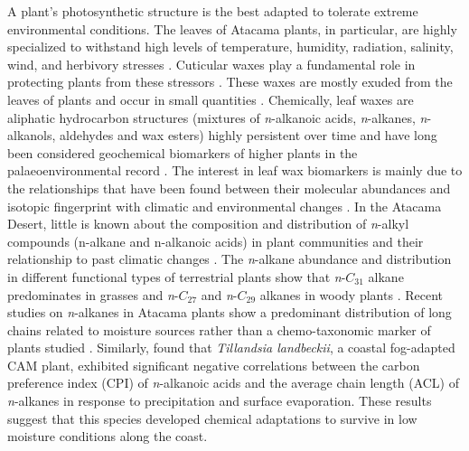 \documentclass[
  authoryear,
  preprint,
  3p]{elsarticle}
\begin{document}
A plant's photosynthetic structure is the best adapted to tolerate
extreme environmental conditions. The leaves of Atacama plants, in
particular, are highly specialized to withstand high levels of
temperature, humidity, radiation, salinity, wind, and herbivory stresses
\citep{eshelPlantEcologicalGenomics2021, dussarratPredictiveMetabolomicsMultiple2022}.
Cuticular waxes play a fundamental role in protecting plants from these
stressors \citep{pollardBuildingLipidBarriers2008}. These waxes are
mostly exuded from the leaves of plants and occur in small quantities
\citep{eglintonChemicalFossilsCombined1973}. Chemically, leaf waxes are
aliphatic hydrocarbon structures (mixtures of \emph{n}-alkanoic acids,
\emph{n}-alkanes, \emph{n}-alkanols, aldehydes and wax esters) highly
persistent over time and have long been considered geochemical
biomarkers of higher plants in the palaeoenvironmental record
\citep{didykOrganicGeochemicalIndicators1978, bushLeafWaxNalkane2013, liEffectsEarlyDiagenesis2017, inglisBiomarkerApproachesReconstructing2022}.
The interest in leaf wax biomarkers is mainly due to the relationships
that have been found between their molecular abundances and isotopic
fingerprint with climatic and environmental changes
\citep{sachseDDValuesIndividual2006, smithInfluencePhysiologyClimate2006}.
In the Atacama Desert, little is known about the composition and
distribution of \emph{n}-alkyl compounds (n-alkane and n-alkanoic acids)
in plant communities and their relationship to past climatic changes
\citep{morchenFingerprintPlantLife2021, contrerasLeafWaxComposition2022}.
The \emph{n}-alkane abundance and distribution in different functional
types of terrestrial plants show that \emph{n}-\(C_{31}\) alkane
predominates in grasses and \emph{n}-\(C_{27}\) and \emph{n}-\(C_{29}\)
alkanes in woody plants \citep{bushLeafWaxNalkane2013}. Recent studies
on \emph{n}-alkanes in Atacama plants show a predominant distribution of
long chains related to moisture sources rather than a chemo-taxonomic
marker of plants studied \citep{morchenFingerprintPlantLife2021}.
Similarly, \citet{contrerasLeafWaxComposition2022} found that
\emph{Tillandsia landbeckii}, a coastal fog-adapted CAM plant, exhibited
significant negative correlations between the carbon preference index
(CPI) of \emph{n}-alkanoic acids and the average chain length (ACL) of
\emph{n}-alkanes in response to precipitation and surface evaporation.
These results suggest that this species developed chemical adaptations
to survive in low moisture conditions along the coast.
\end{document}
